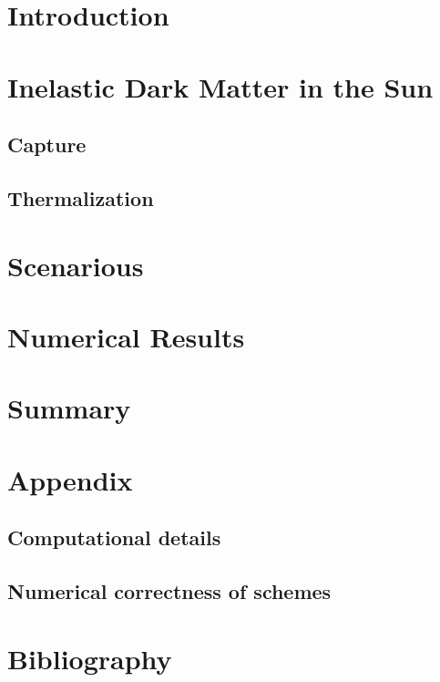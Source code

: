 


	
	\tableofcontents
	\section{Introduction}
	
	
	\section{Inelastic Dark Matter in the Sun}
	
	\subsection{Capture}
	
	\subsection{Thermalization}
	
	
	\section{Scenarious}
	
	
	
	
	\section{Numerical Results}
	
	
	\section{Summary}
	
	\section{Appendix}
	\subsection{Computational details}
	
	\subsection{Numerical correctness of schemes}
	
	
	\section{Bibliography}
	
	

